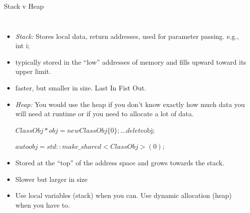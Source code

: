\documentclass[10pt,times]{beamer}
\begin{document}
\begin{frame}{Stack v Heap}
\begin{columns}
\begin{itemize}
\item \textit{Stack:} Stores local data, return
addresses, used for parameter
passing. e.g., int i; 
\item typically stored in the ``low'' addresses of memory and 
fills upward toward its upper limit. 

\item faster, but smaller in size. Last In Fist Out.

\item \textit{Heap:} You would use the heap if you don't know exactly how much
data you will need at runtime or if you need to allocate a lot of data.

$ClassObj* obj = new ClassObj\{0\};  ... delete\mathrm{ obj};$

$auto obj = std::make\_shared < ClassObj>(0);$

\item Stored at the ``top'' of the address space and grows 
towards the stack. 

\item Slower but larger in size

\item Use local variables (stack) when you can. Use dynamic
allocation (heap) when you have to.

\end{itemize}


\end{columns}
\end{frame}
\end{document}
